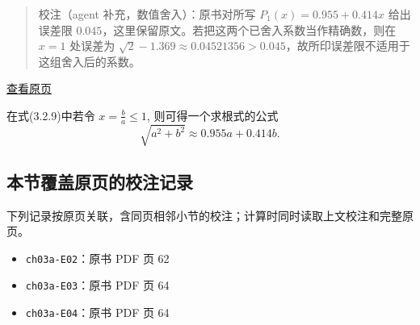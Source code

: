 \documentclass[
  10pt,
  fontset=fandol]{ctexart}
\providecommand{\tightlist}{%
  \setlength{\itemsep}{0pt}\setlength{\parskip}{0pt}}
\begin{document}
\begin{quote}
校注（agent 补充，数值舍入）：原书对所写 \(P_1(x)=0.955+0.414x\) 给出误差限 \(0.045\)，这里保留原文。若把这两个已舍入系数当作精确数，则在 \(x=1\) 处误差为 \(\sqrt2-1.369\approx0.04521356>0.045\)，故所印误差限不适用于这组舍入后的系数。
\end{quote}

\href{../../source-images/pdf-065.jpeg}{查看原页}

在式(3.2.9)中若令 \(x = \frac{b}{a} \leqslant 1\), 则可得一个求根式的公式 \[
\sqrt{a^2 + b^2} \approx 0.955a + 0.414b.
\]

\subsection{本节覆盖原页的校注记录}\label{ux672cux8282ux8986ux76d6ux539fux9875ux7684ux6821ux6ce8ux8bb0ux5f55}

下列记录按原页关联，含同页相邻小节的校注；计算时同时读取上文校注和完整原页。

\begin{itemize}
\tightlist
\item
  \texttt{ch03a-E02}：原书 PDF 页 62
\item
  \texttt{ch03a-E03}：原书 PDF 页 64
\item
  \texttt{ch03a-E04}：原书 PDF 页 64
\end{itemize}
\end{document}
